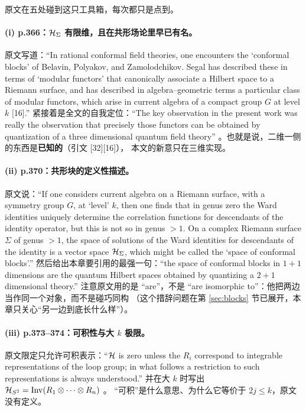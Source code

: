 原文在五处碰到这只工具箱，每次都只是点到。

\paragraph{(i) p.366：$\mathcal{H}_\Sigma$ 有限维，且在共形场论里早已有名。}
原文写道：“In rational conformal field theories, one encounters the `conformal blocks' of
Belavin, Polyakov, and Zamolodchikov. Segal has described these in terms of `modular functors'
that canonically associate a Hilbert space to a Riemann surface, and has described in
algebra--geometric terms a particular class of modular functors, which arise in current algebra
of a compact group $G$ at level $k$ [16].” 
紧接着是全文的自我定位：“The key observation in the present work was really the observation
that precisely those functors can be obtained by quantization of a three dimensional quantum
field theory” 。也就是说，二维一侧的东西是\textbf{已知的}（引文 [32][16]），
本文的新意只在三维实现。

\paragraph{(ii) p.370：共形块的定义性描述。}
原文说：“If one considers current algebra on a Riemann surface, with a symmetry group $G$,
at `level' $k$, then one finds that in genus zero the Ward identities uniquely determine the
correlation functions for descendants of the identity operator, but this is not so in genus $>1$.
On a complex Riemann surface $\Sigma$ of genus $>1$, the space of solutions of the Ward
identities for descendants of the identity is a vector space $\mathcal{H}_\Sigma$, which might be called
the `space of conformal blocks'.” 
然后给出本章要引用的最强一句：“the space of conformal blocks in $1+1$ dimensions are the
quantum Hilbert spaces obtained by quantizing a $2+1$ dimensional theory.” 
注意原文用的是 “are”，不是 “are isomorphic to”：他把两边当作同一个对象，而不是碰巧同构
（这个措辞问题在第 \ref{sec:blocks} 节已展开，本章只关心“另一边到底长什么样”）。

\paragraph{(iii) p.373--374：可积性与大 $k$ 极限。}
原文限定只允许可积表示：“$\mathcal{H}$ is zero unless the $R_i$ correspond to integrable
representations of the loop group; in what follows a restriction to such representations is
always understood.” 
并在大 $k$ 时写出 $\mathcal{H}_{S^2}=\mathrm{Inv}(R_1\otimes\cdots\otimes R_n)$ 。
“可积”是什么意思、为什么它等价于 $2j\le k$，原文没有定义。

